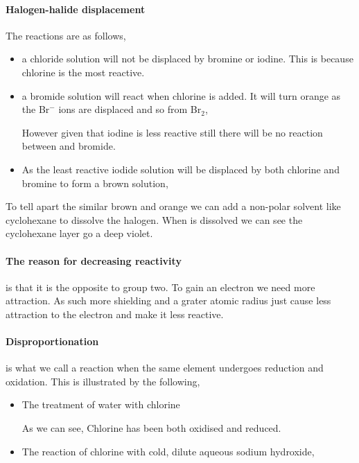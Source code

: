 	\paragraph{Halogen-halide displacement} The reactions are as follows,
	\begin{itemize}
		\item a chloride solution will not be displaced by bromine or iodine. This is because chlorine is the most reactive.
		\item a bromide solution will react when chlorine is added. It will turn orange as the Br$^-$ ions are displaced and so from Br$_2$,
		
			However given that iodine is less reactive still there will be no reaction between  and bromide.
		\item As the least reactive iodide solution will be displaced by both chlorine and bromine to form a brown solution,
		
			
	\end{itemize}
	To tell apart the similar brown and orange we can add a non-polar solvent like cyclohexane to dissolve the halogen. When  is dissolved we can see the cyclohexane layer go a deep violet.
	
	\paragraph{The reason for decreasing reactivity} is that it is the opposite to group two. To gain an electron we need more attraction. As such more shielding and a grater atomic radius just cause less attraction to the electron and make it less reactive.
	
	\paragraph{Disproportionation} is what we call a reaction when the same element undergoes reduction and oxidation. This is illustrated by the following,
	\begin{itemize}
		\item The treatment of water with chlorine
		
		
		As we can see, Chlorine has been both oxidised and reduced.
		
		\item The reaction of chlorine with cold, dilute aqueous sodium hydroxide,
		
	\end{itemize}
	

